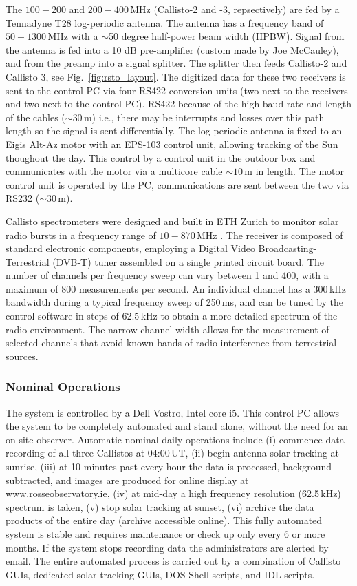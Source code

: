 The $100-200$ and $200-400$\,MHz (Callisto-2 and -3, repsectively) are fed by a Tennadyne T28 log-periodic antenna. The antenna has a frequency band of $50 -1300$\,MHz with a $\sim$50 degree half-power beam width (HPBW). Signal from the antenna is fed into a 10 dB pre-amplifier (custom made by Joe McCauley), and from the preamp into a signal splitter. The splitter then feeds Callisto-2 and Callisto 3, see Fig.~\ref{fig:rsto_layout}. The digitized data for these two receivers is sent to the control PC via four RS422 conversion units (two next to the receivers and two next to the control PC). RS422 because of the high baud-rate and length of the cables ($\sim30$\,m) i.e., there may be interrupts and losses over this path length so the signal is sent differentially. The log-periodic antenna is fixed to an Eigis Alt-Az motor with an EPS-103 control unit, allowing tracking of the Sun thoughout the day. This control by a control unit in the outdoor box and communicates with the motor via a multicore cable $\sim10$\,m in length. The motor control unit is operated by the PC, communications are sent between the two via RS232 ($\sim30$\,m).

Callisto spectrometers were designed and built in ETH Zurich to monitor solar radio bursts in a frequency range of $10 - 870$\,MHz \citep{Benz2005}. The receiver is composed of standard electronic components, employing a Digital Video Broadcasting-Terrestrial (DVB-T) tuner assembled on a single printed circuit board. The number of channels per frequency sweep can vary between 1 and 400, with a maximum of 800 measurements per second. An individual channel has a 300\,kHz bandwidth during a typical frequency sweep of 250\,ms, and can be tuned by the control software in steps of 62.5\,kHz to obtain a more detailed spectrum of the radio environment. The narrow channel width allows for the measurement of selected channels that avoid known bands of radio interference from terrestrial sources.

\subsubsection{Nominal Operations}

The system is controlled by a Dell Vostro, Intel core i5. This control PC allows the system to be completely automated and stand alone, without the need for an on-site observer. Automatic nominal daily operations include (i) commence data recording of all three Callistos at 04:00\,UT, (ii) begin antenna solar tracking at sunrise, (iii) at 10 minutes past every hour the data is processed, background subtracted, and images are produced for online display at www.rosseobservatory.ie, (iv) at mid-day a high frequency resolution (62.5\,kHz) spectrum is taken, (v) stop solar tracking at sunset, (vi) archive the data products of the entire day (archive accessible online). This fully automated system is stable and requires maintenance or check up only every 6 or more months. If the system stops recording data the administrators are alerted by email. The entire automated process is carried out by a combination of Callisto GUIs, dedicated solar tracking GUIs, DOS Shell scripts, and IDL scripts.

